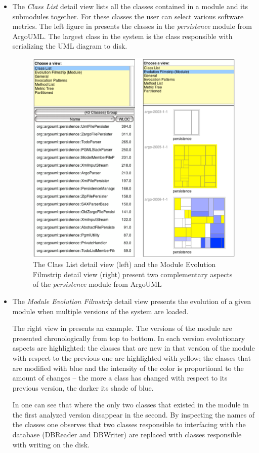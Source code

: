 \documentclass[preprint,12pt]{elsarticle}
\begin{document}
\begin{itemize}

\item The {\em Class List} detail view lists all the classes contained in a module and its submodules together. For these classes the user can select various software metrics. The left figure in  presents the classes in the {\em persistence} module from ArgoUML. The largest class in the system is the class responsible with serializing the UML diagram to disk.

\begin{figure}[h]
\begin{center}
\includegraphics[width=0.8\linewidth]{images/ModuleDetails}
\caption{The Class List detail view (left) and the Module Evolution Filmstrip detail view (right) present two complementary aspects of the {\em persistence} module from ArgoUML} 
\end{center}
\end{figure}

\item The {\em Module Evolution Filmstrip} detail view presents the evolution of a given module when multiple versions of the system are loaded. 

The right view in  presents an example. The versions of the module are presented chronologically from top to bottom. In each version evolutionary aspects are highlighted: the classes that are new in that version of the module with respect to the previous one are highlighted with yellow; the classes that are modified with blue and the intensity of the color is proportional to the amount of changes -- the more a class has changed with respect to its previous version, the darker its shade of blue. 

In  one can see that where the only two classes that existed in the module in the first analyzed version disappear in the second. By inspecting the names of the classes one observes that two classes responsible to interfacing with the database (DBReader and DBWriter) are replaced with classes responsible with writing on the disk.
\end{itemize}
\end{document}
